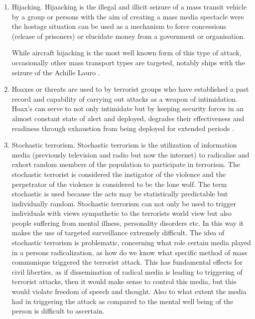 \begin{enumerate}
\item Hijacking. Hijaacking is the illegal and illicit seizure of a mass transit vehicle by a group or persons with the aim of creating a mass media spectacle were the hostage situation can be used as a  mechanism to force concessions (release of prisoners) or elucidate money from a government or organisation. 

While aircraft hijacking is the most well known form of this type of attack, occasionally other mass transport types are targeted, notably ships with the seizure of the Achille Lauro \citep{halberstam1988terrorism}.

\item Hoaxes or threats are used to by terrorist groups who have established a past record and capability of carrying out attacks as a weapon of intimidation. Hoax's can serve to not only intimidate but by keeping security forces in an almost constant state of alert and deployed, degrades their effectiveness and readiness through exhaustion from being deployed for extended periods \citep{nagl2008us}.

\item Stochastic terrorism. Stochastic terrorism is the utilization of information media (previously television and radio but now the internet) to radicalise and exhort random members of the population to participate in terrorism. The stochastic terrorist is considered the instigator of the violence and the perpetrator of the violence is considered to be the lone wolf. The term stochastic is used because the acts may be statistically predictable but individually random. Stochastic terrorism can not only be used to trigger individuals with views sympathetic to the terrorists world view but also people suffering from mental illness, personality disorders etc. In this way it makes the use of targeted surveillance extremely difficult. The idea of stochastic terrorism is problematic, concerning what role certain media played in a persons radicalization, as how do we know what specific method of mass communique triggered the terrorist attack. This has fundamental effects for civil liberties, as if dissemination of radical media is leading to triggering of terrorist attacks, then it would make sense to control this media, but this would violate freedom of speech and thought. Also to what extent the media had in triggering the attack as compared to the mental well being of the person is difficult to ascertain. 
\end{enumerate}

